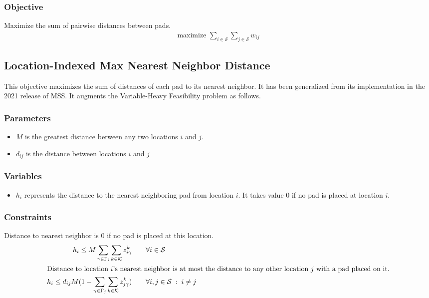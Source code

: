 \documentclass[10pt]{article}
\begin{document}
	\subsubsection{Objective}
	\noindent Maximize the sum of pairwise distances between pads.
	\begin{align}
		\text{maximize } \sum_{i \in \mathcal{S}} \sum_{j \in \mathcal{S}} w_{ij}
	\end{align}

	\subsection{Location-Indexed Max Nearest Neighbor Distance}
	This objective maximizes the sum of distances of each pad to its nearest neighbor. It has been generalized from its implementation in the 2021 release of MSS. It augments the Variable-Heavy Feasibility problem as follows.
	
	\subsubsection{Parameters}
	\begin{itemize}
		\item $ M $ is the greatest distance between any two locations $ i $ and $ j $.
		\item $d_{ij}$ is the distance between locations $ i $ and $ j $
	\end{itemize}
	
	\subsubsection{Variables}
	\begin{itemize}
		\item $ h_i $ represents the distance to the nearest neighboring pad from location $ i $. It takes value 0 if no pad is placed at location $ i $.
	\end{itemize}
	
	\subsubsection{Constraints}
	\noindent Distance to nearest neighbor is 0 if no pad is placed at this location.
	\begin{alignat}{2}
		h_i \leq M \sum_{\gamma \in \Gamma_i} \sum_{k \in \mathcal{K}} z_{i\gamma}^k & \qquad \forall i \in \mathcal{S} \\
		\intertext{Distance to location $ i $'s nearest neighbor is at most the distance to any other location $ j $ with a pad placed on it.}
		h_i \leq d_{ij} M (1 - \sum_{\gamma \in \Gamma_j} \sum_{k \in \mathcal{K}} z_{j\gamma}^k) & \qquad \forall i, j \in \mathcal{S} \; : \; i \neq j
	\end{alignat}
	
\end{document}
